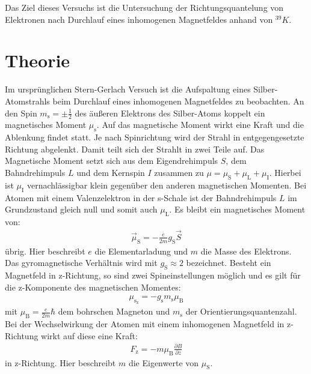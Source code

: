 
Das Ziel dieses Versuchs ist die Untersuchung der Richtungsquantelung von Elektronen nach Durchlauf eines
inhomogenen Magnetfeldes anhand von $^{39}K$.
\section{Theorie}
\label{sec:Theorie}
Im ursprünglichen Stern-Gerlach Versuch ist die Aufspaltung eines Silber-Atomstrahls beim
Durchlauf eines inhomogenen Magnetfeldes zu beobachten.
An den Spin $m_\mathrm{s}=\pm\frac{1}{2}$ des äußeren Elektrons des Silber-Atoms koppelt ein magnetisches
Moment $\mu_\mathrm{s}$. Auf das magnetische Moment wirkt eine Kraft und die Ablenkung
findet statt. Je nach Spinrichtung
wird der Strahl in entgegengesetzte Richtung abgelenkt. Damit teilt sich der Strahlt in zwei Teile auf.
Das Magnetische Moment setzt sich aus dem Eigendrehimpuls $S$,
dem Bahndrehimpuls $L$ und dem Kernspin $I$ zusammen zu $\mu=\mu_\mathrm{S}+\mu_\mathrm{L}+\mu_\mathrm{I}$.
Hierbei ist $\mu_\mathrm{I}$ vernachlässigbar klein gegenüber den anderen
magnetischen Momenten.
Bei Atomen mit einem Valenzelektron in der s-Schale ist der Bahndrehimpuls
$L$ im Grundzustand gleich null und somit auch $\mu_\mathrm{L}$.
Es bleibt ein magnetisches Moment von:
\begin{align}
  \vec{\mu}_\mathrm{S}=-\frac{e}{2m}g_\mathrm{S}\vec{S}
\end{align}
übrig. Hier beschreibt $e$ die Elementarladung und $m$ die Masse des Elektrons.
Das gyromagnetische Verhältnis wird mit $g_\mathrm{S}\approx 2$ bezeichnet.
Besteht ein Magnetfeld in z-Richtung, so sind zwei Spineinstellungen möglich und
es gilt für die z-Komponente des magnetischen Momentes:
\begin{align}
  \mu_\mathrm{s_\mathrm{z}}=-g_\mathrm{s}m_\mathrm{s}\mu_\mathrm{B}
\end{align}
mit $\mu_\mathrm{B}=\frac{e}{2m}\hbar$ dem bohrschen Magneton und $m_\mathrm{s}$ der Orientierungsquantenzahl.
Bei der Wechselwirkung der Atomen mit einem inhomogenen Magnetfeld
in z-Richtung wirkt auf diese eine Kraft:
\begin{align}
  F_\mathrm{z}=-m\mu_\mathrm{B}\frac{\partial B}{\partial z}
\end{align}
in z-Richtung. Hier beschreibt $m$ die Eigenwerte von $\mu_\mathrm{S}$.

